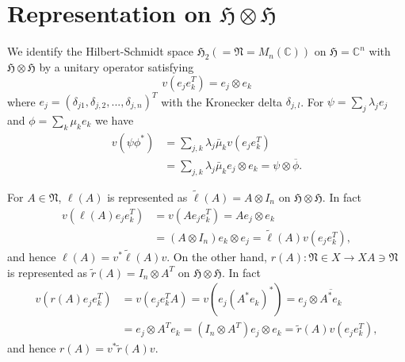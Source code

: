 \section{Representation on $\mathfrak{H}\otimes\mathfrak{H}$}

 We identify the Hilbert-Schmidt space $\mathfrak{H}_2(=\mathfrak{N}=M_n(\mathbb{C}))$ on $\mathfrak{H}=\mathbb{C}^n$ with $\mathfrak{H}\otimes\mathfrak{H}$
by a unitary operator satisfying 
$$
v(e_je_k^T)=e_j\otimes e_k
$$
where $e_j=(\delta_{j1},\delta_{j,2},...,\delta_{j,n})^T$ with the Kronecker delta $\delta_{j,l}$. 
For $\psi=\sum_j \lambda_j e_j$ and $\phi=\sum_k \mu_k e_k$
we have
\begin{equation}
\begin{split}
v(\psi\phi^\ast)&=\sum_{j,k}\lambda_j\bar{\mu}_k v(e_je_k^T)\\
&=\sum_{j,k}\lambda_j\bar{\mu}_k e_j\otimes e_k={\psi}\otimes \overline{\phi}.
\end{split}
\end{equation}

For $A\in \mathfrak{N}$, $\ell(A)$ is represented as $\tilde{\ell}(A)=A\otimes I_n$ on $\mathfrak{H}\otimes\mathfrak{H}$.
In fact
 \begin{equation}
 \begin{split}
 v(\ell(A)e_je_k^T)&=v(Ae_je_k^T)=Ae_j\otimes e_k\\
 &= (A\otimes I_n)e_k\otimes  e_j=\tilde{\ell}(A)v(e_je_k^T),
 \end{split} 
 \end{equation}
 and hence $\ell(A)=v^{\ast}\tilde{\ell}(A)v$. 
On the other hand, $r(A):\mathfrak{N}\in X \to XA\ni\mathfrak{N}$ is 
represented as $\tilde{r}(A)=I_n\otimes A^T$ on $\mathfrak{H}\otimes\mathfrak{H}$.
In fact
 \begin{equation}
 \begin{split}
 v(r(A)e_je_k^T)&=v(e_je_k^TA)=v(e_j(A^\ast e_k)^\ast)=e_j\otimes \overline{A^\ast e_k}\\
 &= e_j \otimes A^T e_k= (I_n\otimes A^T)e_j\otimes  e_k=\tilde{r}(A)v(e_je_k^T),
 \end{split} 
 \end{equation}
 and hence $r(A)=v^{\ast}\tilde{r}(A) v$. 
